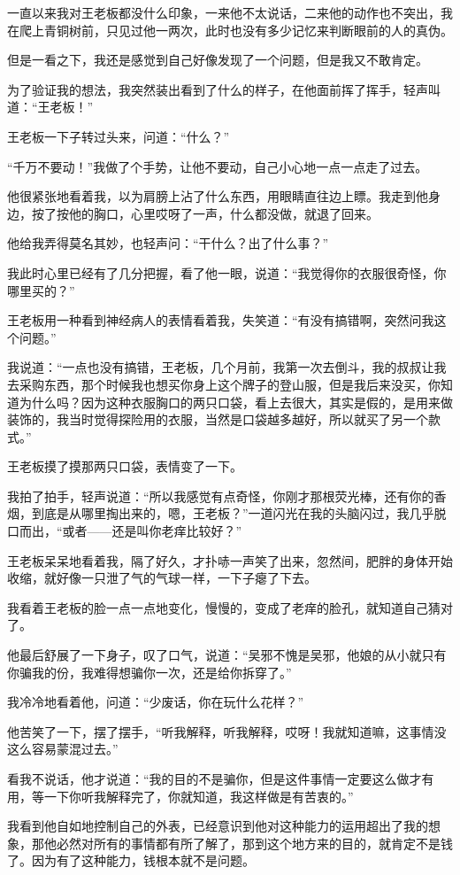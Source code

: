一直以来我对王老板都没什么印象，一来他不太说话，二来他的动作也不突出，我在爬上青铜树前，只见过他一两次，此时也没有多少记忆来判断眼前的人的真伪。

但是一看之下，我还是感觉到自己好像发现了一个问题，但是我又不敢肯定。

为了验证我的想法，我突然装出看到了什么的样子，在他面前挥了挥手，轻声叫道：“王老板！”

王老板一下子转过头来，问道：“什么？”

“千万不要动！”我做了个手势，让他不要动，自己小心地一点一点走了过去。

他很紧张地看着我，以为肩膀上沾了什么东西，用眼睛直往边上瞟。我走到他身边，按了按他的胸口，心里哎呀了一声，什么都没做，就退了回来。

他给我弄得莫名其妙，也轻声问：“干什么？出了什么事？”

我此时心里已经有了几分把握，看了他一眼，说道：“我觉得你的衣服很奇怪，你哪里买的？”

王老板用一种看到神经病人的表情看着我，失笑道：“有没有搞错啊，突然问我这个问题。”

我说道：“一点也没有搞错，王老板，几个月前，我第一次去倒斗，我的叔叔让我去采购东西，那个时候我也想买你身上这个牌子的登山服，但是我后来没买，你知道为什么吗？因为这种衣服胸口的两只口袋，看上去很大，其实是假的，是用来做装饰的，我当时觉得探险用的衣服，当然是口袋越多越好，所以就买了另一个款式。”

王老板摸了摸那两只口袋，表情变了一下。

我拍了拍手，轻声说道：“所以我感觉有点奇怪，你刚才那根荧光棒，还有你的香烟，到底是从哪里掏出来的，嗯，王老板？”一道闪光在我的头脑闪过，我几乎脱口而出，“或者——还是叫你老痒比较好？”

王老板呆呆地看着我，隔了好久，才扑哧一声笑了出来，忽然间，肥胖的身体开始收缩，就好像一只泄了气的气球一样，一下子瘪了下去。

我看着王老板的脸一点一点地变化，慢慢的，变成了老痒的脸孔，就知道自己猜对了。

他最后舒展了一下身子，叹了口气，说道：“吴邪不愧是吴邪，他娘的从小就只有你骗我的份，我难得想骗你一次，还是给你拆穿了。”

我冷冷地看着他，问道：“少废话，你在玩什么花样？”

他苦笑了一下，摆了摆手，“听我解释，听我解释，哎呀！我就知道嘛，这事情没这么容易蒙混过去。”

看我不说话，他才说道：“我的目的不是骗你，但是这件事情一定要这么做才有用，等一下你听我解释完了，你就知道，我这样做是有苦衷的。”

我看到他自如地控制自己的外表，已经意识到他对这种能力的运用超出了我的想象，那他必然对所有的事情都有所了解了，那到这个地方来的目的，就肯定不是钱了。因为有了这种能力，钱根本就不是问题。

